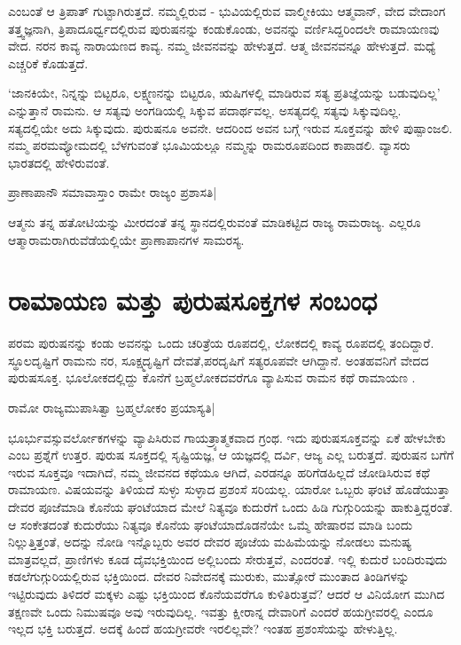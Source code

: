 ಎಂಬಂತೆ ಆ ತ್ರಿಪಾತ್ ಗುಟ್ಟಾಗಿರುತ್ತದೆ. ನಮ್ಮಲ್ಲಿರುವ - ಭುವಿಯಲ್ಲಿರುವ ವಾಲ್ಮೀಕಿಯು ಆತ್ಮವಾನ್, ವೇದ ವೇದಾಂಗ ತತ್ತ್ವಜ್ಞನಾಗಿ, ತ್ರಿಪಾದೂರ್ಧ್ವದಲ್ಲಿರುವ ಪುರುಷನನ್ನು ಕಂಡುಕೊಂಡು, ಅವನನ್ನು ವರ್ಣಿಸಿದ್ದರಿಂದಲೇ ರಾಮಾಯಣವು ವೇದ. ನರನ ಕಾವ್ಯ ನಾರಾಯಣದ ಕಾವ್ಯ. ನಮ್ಮ ಜೀವನವನ್ನು ಹೇಳುತ್ತದೆ. ಆತ್ಮ ಜೀವನವನ್ನೂ ಹೇಳುತ್ತದೆ. ಮಧ್ಯೆ ಎಚ್ಚರಿಕೆ ಕೊಡುತ್ತದೆ. 

`ಜಾನಕಿಯೇ, ನಿನ್ನನ್ನು ಬಿಟ್ಟರೂ, ಲಕ್ಷ್ಮಣನನ್ನು ಬಿಟ್ಟರೂ, ಋಷಿಗಳಲ್ಲಿ ಮಾಡಿರುವ ಸತ್ಯ ಪ್ರತಿಜ್ಞೆಯನ್ನು  ಬಡುವುದಿಲ್ಲ' ಎನ್ನುತ್ತಾನೆ ರಾಮನು. ಆ ಸತ್ಯವು ಅಂಗಡಿಯಲ್ಲಿ ಸಿಕ್ಕುವ ಪದಾರ್ಥವಲ್ಲ. ಅಸತ್ಯದಲ್ಲಿ ಸತ್ಯವು ಸಿಕ್ಕುವುದಿಲ್ಲ. ಸತ್ಯದಲ್ಲಿಯೇ ಅದು ಸಿಕ್ಕುವುದು. ಪುರುಷನೂ ಅವನೇ. ಆದರಿಂದ ಅವನ ಬಗ್ಗೆ ಇರುವ ಸೂಕ್ತವನ್ನು ಹೇಳಿ ಪುಷ್ಪಾಂಜಲಿ. ನಮ್ಮ ಪರಮವ್ಯೋಮದಲ್ಲಿ ಬೆಳಗುವಂತೆ ಭೂಮಿಯಲ್ಲೂ ನಮ್ಮನ್ನು ರಾಮರೂಪದಿಂದ ಕಾಪಾಡಲಿ. ವ್ಯಾಸರು ಭಾರತದಲ್ಲಿ ಹೇಳಿರುವಂತೆ.

\begin{shloka}
ಪ್ರಾಣಾಪಾನೌ ಸಮಾವಾಸ್ತಾಂ ರಾಮೇ ರಾಜ್ಯಂ ಪ್ರಶಾಸತಿ|
\end{shloka}

ಆತ್ಮನು ತನ್ನ ಹತೋಟಿಯನ್ನು ಮೀರದಂತೆ ತನ್ನ ಸ್ಥಾನದಲ್ಲಿರುವಂತೆ ಮಾಡಿಕಟ್ಟಿದ ರಾಜ್ಯ ರಾಮರಾಜ್ಯ. ಎಲ್ಲರೂ ಆತ್ಮಾರಾಮರಾಗಿರುವೆಡೆಯಲ್ಲಿಯೇ ಪ್ರಾಣಾಪಾನಗಳ ಸಾಮರಸ್ಯ. 

\section*{ರಾಮಾಯಣ ಮತ್ತು ಪುರುಷಸೂಕ್ತಗಳ ಸಂಬಂಧ}

ಪರಮ ಪುರುಷನನ್ನು ಕಂಡು ಅವನನ್ನು ಒಂದು ಚರಿತ್ರೆಯ ರೂಪದಲ್ಲಿ, ಲೋಕದಲ್ಲಿ ಕಾವ್ಯ ರೂಪದಲ್ಲಿ ತಂದಿದ್ದಾರೆ. ಸ್ಥೂಲದೃಷ್ಟಿಗೆ ರಾಮನು ನರ, ಸೂಕ್ಷ್ಮದೃಷ್ಟಿಗೆ ದೇವತೆ,ಪರದೃಷಿಗೆ ಸತ್ಯರೂಪವೇ ಆಗಿದ್ದಾನೆ. ಅಂತಹವನಿಗೆ ವೇದದ ಪುರುಷಸೂಕ್ತ. ಭೂಲೋಕದಲ್ಲಿದ್ದು ಕೊನೆಗೆ ಬ್ರಹ್ಮಲೋಕದವರೆಗೂ ವ್ಯಾಪಿಸುವ ರಾಮನ ಕಥೆ ರಾಮಾಯಣ . 

\begin{shloka}
ರಾಮೋ ರಾಜ್ಯಮುಪಾಸಿತ್ವಾ ಬ್ರಹ್ಮಲೋಕಂ ಪ್ರಯಾಸ್ಯತಿ|
\end{shloka}

ಭೂರ್ಭುವಸ್ಸುವರ್ಲೋಕಗಳನ್ನು ವ್ಯಾಪಿಸಿರುವ ಗಾಯತ್ರ್ಯಾತ್ಮಕವಾದ ಗ್ರಂಥ. ಇದು ಪುರುಷಸೂಕ್ತವನ್ನು ಏಕೆ ಹೇಳಬೇಕು ಎಂಬ ಪ್ರಶ್ನೆಗೆ ಉತ್ತರ. ಪುರುಷ ಸೂಕ್ತದಲ್ಲಿ ಸೃಷ್ಟಿಯಜ್ಞ, ಆ ಯಜ್ಞದಲ್ಲಿ ದರ್ವಿ, ಆಜ್ಯ ಎಲ್ಲ ಬರುತ್ತದೆ. ಪುರುಷನ ಬಗೆಗೆ ಇರುವ ಸೂಕ್ತವೂ ಇದಾಗಿದೆ, ನಮ್ಮ ಜೀವನದ ಕಥೆಯೂ ಆಗಿದೆ, ಎರಡನ್ನೂ ಹರಿಗೆಡಹಿಲ್ಲದೆ ಜೋಡಿಸಿರುವ ಕಥೆ ರಾಮಾಯಣ. ವಿಷಯವನ್ನು ತಿಳಿಯದೆ ಸುಳ್ಳು ಸುಳ್ಳಾದ ಪ್ರಶಂಸೆ ಸರಿಯಲ್ಲ. ಯಾರೋ ಒಬ್ಬರು ಘಂಟೆ ಹೊಡೆಯುತ್ತಾ ದೇವರ ಪೂಜೆಮಾಡಿ ಕೊನೆಯ ಘಂಟೆಯಾದ ಮೇಲೆ ನಿತ್ಯವೂ ಕುದುರೆಗೆ ಒಂದು ಹಿಡಿ ಗುಗ್ಗುರಿಯನ್ನು ಹಾಕುತ್ತಿದ್ದರಂತೆ. ಆ ಸಂಕೇತದಂತೆ ಕುದುರೆಯು ನಿತ್ಯವೂ ಕೊನೆಯ ಘಂಟೆಯಾದೊಡನೆಯೇ ಒಮ್ಮೆ ಹೇಷಾರವ ಮಾಡಿ ಬಂದು ನಿಲ್ಲುತ್ತಿತ್ತಂತೆ, ಅದನ್ನು ನೋಡಿ ಇನ್ನೊಬ್ಬರು ಅವರ ದೇವರ ಪೂಜೆಯ ಮಹಿಮೆಯನ್ನು ನೋಡಲು ಮನುಷ್ಯ ಮಾತ್ರವಲ್ಲದೆ, ಪ್ರಾಣಿಗಳು ಕೂಡ ದೈವಭಕ್ತಿಯಿಂದ ಅಲ್ಲಿಬಂದು ಸೇರುತ್ತವೆ, ಎಂದರಂತೆ. ಇಲ್ಲಿ ಕುದುರೆ ಬಂದಿರುವುದು ಕಡಲೆಗುಗ್ಗುರಿಯಲ್ಲಿರುವ ಭಕ್ತಿಯಿಂದ. ದೇವರ ನಿವೇದನಕ್ಕೆ ಮುರುಕು, ಮುತ್ಸೋರೆ ಮುಂತಾದ ತಿಂಡಿಗಳನ್ನು ಇಟ್ಟಿರುವುದು ತಿಳಿದರೆ ಮಕ್ಕಳು ಎಷ್ಟು ಭಕ್ತಿಯಿಂದ ಕೊನೆಯವರೆಗೂ ಕುಳಿತಿರುತ್ತವೆ? ಆದರೆ ಆ ವಿನಿಯೋಗ ಮುಗಿದ ತಕ್ಷಣವೇ ಒಂದು ನಿಮುಷವೂ ಅವು ಇರುವುದಿಲ್ಲ. ಇವತ್ತು ಕ್ಷೀರಾನ್ನ ದೇವಾರಿಗೆ ಎಂದರೆ ಹಯಗ್ರೀವರಲ್ಲಿ ಎಂದೂ ಇಲ್ಲದ ಭಕ್ತಿ ಬರುತ್ತದೆ. ಅದಕ್ಕೆ ಹಿಂದೆ ಹಯಗ್ರೀವರೇ ಇರಲಿಲ್ಲವೇ? ಇಂತಹ ಪ್ರಶಂಸೆಯನ್ನು ಹೇಳುತ್ತಿಲ್ಲ. 

